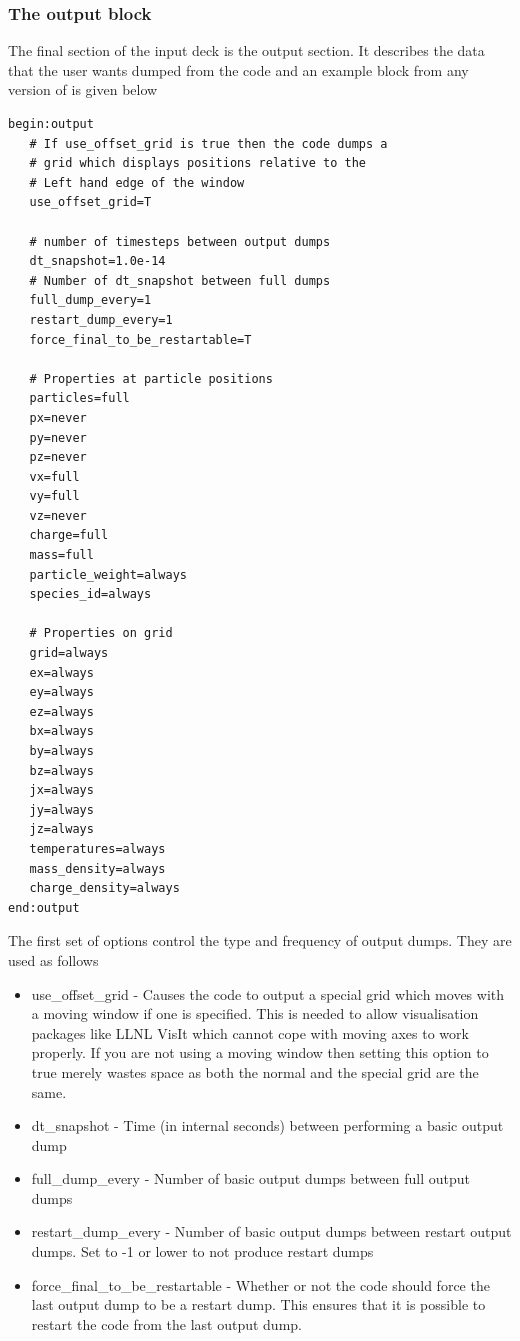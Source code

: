 \documentclass[12pt,a4paper]{article}
\newcommand{\simpleboxverbatim}{\begin{Verbatim}[obeytabs=true,frame=single,
  framerule=0.5mm,rulecolor=\color{warwickmid},formatcom=\color{black}]}
\newcommand{\EPOCH}{{\color{warwickdark}\fontfamily{phv}\selectfont{EPOCH}}}
\begin{document}
\subsubsection{The output block}
The final section of the input deck is the output section. It describes the
data that the user wants dumped from the code and an example block from any
version of {\EPOCH} is given below\\
\simpleboxverbatim
begin:output
   # If use_offset_grid is true then the code dumps a
   # grid which displays positions relative to the
   # Left hand edge of the window
   use_offset_grid=T

   # number of timesteps between output dumps
   dt_snapshot=1.0e-14
   # Number of dt_snapshot between full dumps
   full_dump_every=1
   restart_dump_every=1
   force_final_to_be_restartable=T

   # Properties at particle positions
   particles=full
   px=never
   py=never
   pz=never
   vx=full
   vy=full
   vz=never
   charge=full
   mass=full
   particle_weight=always
   species_id=always

   # Properties on grid
   grid=always
   ex=always
   ey=always
   ez=always
   bx=always
   by=always
   bz=always
   jx=always
   jy=always
   jz=always
   temperatures=always
   mass_density=always
   charge_density=always
end:output
\end{Verbatim}

The first set of options control the type and frequency of output dumps. They
are used as follows\\
\begin{itemize}
\item use\_offset\_grid - Causes the code to output a special grid which moves
  with a moving window if one is specified. This is needed to allow
  visualisation packages like LLNL VisIt which cannot cope with moving axes to
  work properly. If you are not using a moving window then setting this option
  to true merely wastes space as both the normal and the special grid are the
  same.
\item dt\_snapshot - Time (in internal seconds) between performing a basic
  output dump
\item full\_dump\_every - Number of basic output dumps between full output
  dumps
\item restart\_dump\_every - Number of basic output dumps between restart
  output dumps. Set to -1 or lower to not produce restart dumps
\item force\_final\_to\_be\_restartable - Whether or not the code should force
  the last output dump to be a restart dump. This ensures that it is possible
  to restart the code from the last output dump.
\end{itemize}
\end{document}

